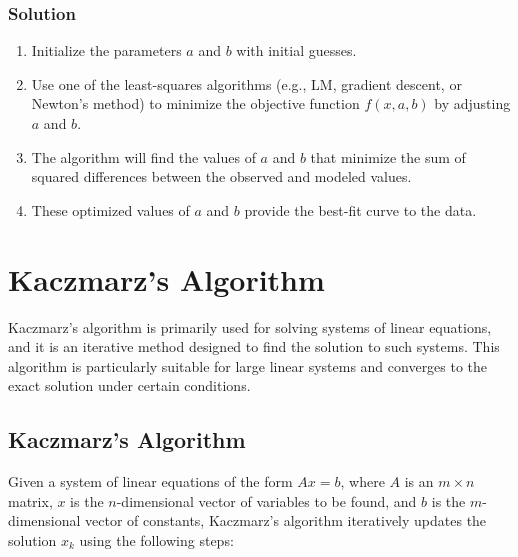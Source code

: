 \documentclass[a4paper]{article}
\begin{document}
\subsubsection{Solution}

\begin{enumerate}
    \item Initialize the parameters $a$ and $b$ with initial guesses.
    
    \item Use one of the least-squares algorithms (e.g., LM, gradient descent, or Newton's method) to minimize the objective function $f(x, a, b)$ by adjusting $a$ and $b$.
    
    \item The algorithm will find the values of $a$ and $b$ that minimize the sum of squared differences between the observed and modeled values.
    
    \item These optimized values of $a$ and $b$ provide the best-fit curve to the data.
\end{enumerate}

\section{Kaczmarz's Algorithm}

Kaczmarz's algorithm is primarily used for solving systems of linear equations, and it is an iterative method designed to find the solution to such systems. This algorithm is particularly suitable for large linear systems and converges to the exact solution under certain conditions.

\subsection{Kaczmarz's Algorithm}

Given a system of linear equations of the form \(Ax = b\), where \(A\) is an \(m \times n\) matrix, \(x\) is the \(n\)-dimensional vector of variables to be found, and \(b\) is the \(m\)-dimensional vector of constants, Kaczmarz's algorithm iteratively updates the solution \(x_k\) using the following steps:
\end{document}
